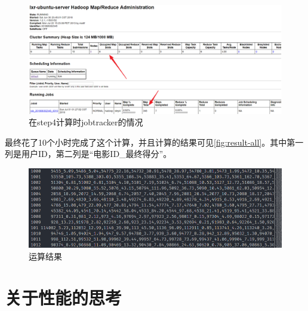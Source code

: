 \documentclass[forprint]{myreport}
\begin{document}
\begin{figure}[htp]
  \centering
  \includegraphics[width=13cm]{"./figure/2018-07-03-14-42-57.png"}
  \caption{在step4计算时jobtracker的情况}
  \label{fig:result-step4-jobtracker}
\end{figure}

最终花了10个小时完成了这个计算，并且计算的结果可见\autoref{fig:result-all}。其中第一列是用户ID，第二列是“电影ID\_最终得分”。



\begin{figure}[htp]
  \centering
  \includegraphics[width=13cm]{"./figure/2018-07-03-14-46-28.png"}
  \caption{运算结果}
  \label{fig:result-all}
\end{figure}


\chapter{关于性能的思考}
\end{document}
